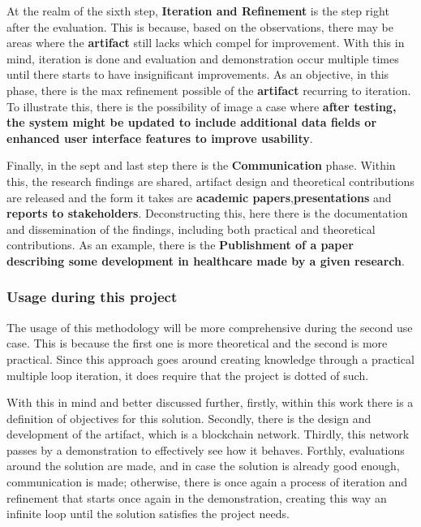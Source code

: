 At the realm of the sixth step, \textbf{Iteration and Refinement} is the step right after the evaluation. This is because, based 
on the observations, there may be areas where the \textbf{artifact} still lacks which compel for improvement. With this in mind, iteration 
is done and evaluation and demonstration occur multiple times until there starts to have insignificant improvements. As an objective, in 
this phase, there is the max refinement possible of the \textbf{artifact} recurring to iteration. To illustrate this, there is the 
possibility of image a case where \textbf{after testing, the system might be updated to include additional data fields or enhanced user 
interface features to improve usability}.

Finally, in the sept and last step there is the \textbf{Communication} phase. Within this, the research findings are shared, artifact 
design and theoretical contributions are released and the form it takes are \textbf{academic papers},\textbf{presentations} and 
\textbf{reports to stakeholders}. Deconstructing this, here there is the documentation and dissemination of the findings, including both 
practical and theoretical contributions. As an example, there is the \textbf{Publishment of a paper describing some development in healthcare 
made by a given research}.

\subsubsection{Usage during this project}

The usage of this methodology will be more comprehensive during the second use case. This is because the first one is more theoretical 
and the second is more practical. Since this approach goes around creating knowledge through a practical multiple loop iteration, it 
does require that the project is dotted of such.

With this in mind and better discussed further, firstly, within this work there is a definition of objectives for this solution. Secondly, 
there is the design and development of the artifact, which is a blockchain network. Thirdly, this network passes by a demonstration to 
effectively see how it behaves. Forthly, evaluations around the solution are made, and in case the solution is already good enough, 
communication is made; otherwise, there is once again a process of iteration and refinement that starts once again in the demonstration, 
creating this way an infinite loop until the solution satisfies the project needs.

